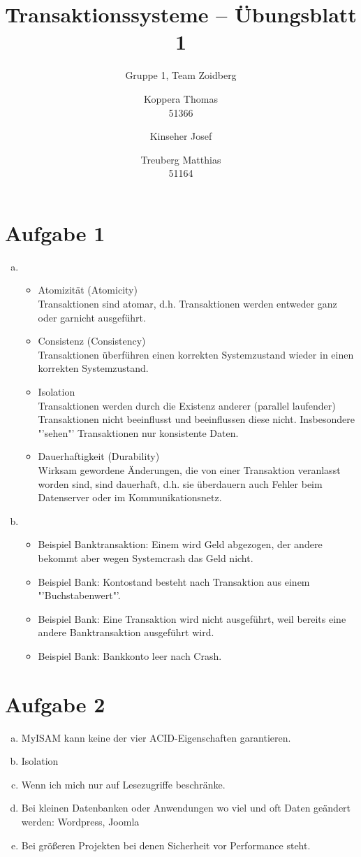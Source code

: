 \documentclass{scrartcl}
\title{Transaktionssysteme -- Übungsblatt 1}
\subtitle{Gruppe 1, Team Zoidberg}
\author{Koppera Thomas \\ 51366
 \and Kinseher Josef \\ 
 \and Treuberg Matthias \\ 51164}
\date{ }
\begin{document}
  \maketitle
  
\section*{Aufgabe 1}
\begin{enumerate}[a)]
\item
\begin{itemize}
\item
Atomizität (Atomicity)\\
Transaktionen sind atomar, d.h. Transaktionen werden entweder ganz
oder garnicht ausgeführt.
\item
Consistenz (Consistency)\\
Transaktionen überführen einen korrekten Systemzustand wieder in
einen korrekten Systemzustand.
\item
Isolation\\
Transaktionen werden durch die Existenz anderer (parallel laufender)
Transaktionen nicht beeinflusst und beeinflussen diese nicht.
Insbesondere "'sehen"' Transaktionen nur konsistente Daten.
\item
Dauerhaftigkeit (Durability)\\
Wirksam gewordene Änderungen, die von einer Transaktion veranlasst
worden sind, sind dauerhaft, d.h. sie überdauern auch Fehler beim
Datenserver oder im Kommunikationsnetz.
\end{itemize}

\item
\begin{itemize}
\item
Beispiel Banktransaktion: Einem wird Geld abgezogen, der andere bekommt aber wegen Systemcrash das Geld nicht.
\item
Beispiel Bank: Kontostand besteht nach Transaktion aus einem "'Buchstabenwert"'.
\item
Beispiel Bank: Eine Transaktion wird nicht ausgeführt, weil bereits eine andere Banktransaktion ausgeführt wird.
\item
Beispiel Bank: Bankkonto leer nach Crash.
\end{itemize}


\end{enumerate}

\section*{Aufgabe 2}
\begin{enumerate}[a)]
\item MyISAM kann keine der vier ACID-Eigenschaften garantieren.
\item Isolation
\item Wenn ich mich nur auf Lesezugriffe beschränke.
\item Bei kleinen Datenbanken oder Anwendungen wo viel und oft Daten geändert werden: Wordpress, Joomla
\item Bei größeren Projekten bei denen Sicherheit vor Performance steht.

\end{enumerate}
\end{document}
